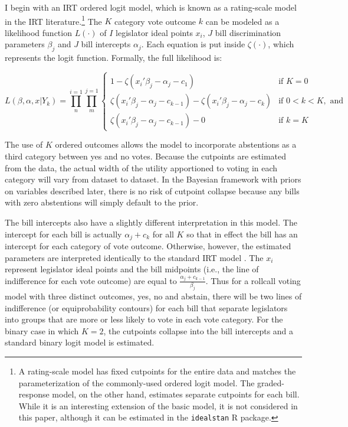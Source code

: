 	I begin with an IRT ordered logit model, which is known as a rating-scale model in the IRT literature.\footnote{A rating-scale model has fixed cutpoints for the entire data and matches the parameterization of the commonly-used ordered logit model. The graded-response model, on the other hand, estimates separate cutpoints for each bill. While it is an interesting extension of the basic model, it is not considered in this paper, although it can be estimated in the \texttt{idealstan} R package.} The $K$ category vote outcome $k$ can be modeled as a likelihood function $L(\cdot)$ of $I$ legislator ideal points $x_i$, $J$ bill discrimination parameters $\beta_j$ and $J$ bill intercepts $\alpha_j$. Each equation is put inside $\zeta(\cdot)$, which represents the logit function. Formally, the full likelihood is:
	
					\[
	L(\beta,\alpha,x|Y_{k}) = \prod_{n}^{i=1} \prod_{m}^{j=1}
	\begin{cases} 
	1 -  \zeta(x_{i}'\beta_j - \alpha_j - c_1) & \text{if } K = 0 \\
	\zeta(x_{i}'\beta_j - \alpha_j - c_{k-1}) - \zeta(x_{i}'\beta_j - \alpha_j - c_{k})       & \text{if } 0 < k < K, \text{ and} \\
	\zeta(x_{i}'\beta_j - \alpha_j - c_{k-1}) - 0 & \text{if } k=K
	\end{cases}
	\]
	
	The use of $K$ ordered outcomes allows the model to incorporate abstentions as a third category between yes and no votes. Because the cutpoints are estimated from the data, the actual width of the utility apportioned to voting in each category will vary from dataset to dataset. In the Bayesian framework with priors on variables described later, there is no risk of cutpoint collapse because any bills with zero abstentions will simply default to the prior.
	
	The bill intercepts also have a slightly different interpretation in this model. The intercept for each bill is actually $\alpha_j + c_k$ for all $K$ so that in effect the bill has an intercept for each category of vote outcome. Otherwise, however, the estimated parameters are interpreted identically to the standard IRT model \parencite{jackman2004}. The $x_i$ represent legislator ideal points and the bill midpoints (i.e., the line of indifference for each vote outcome) are equal to $\frac{\alpha_j + c_{k-1}}{\beta_j}$. Thus for a rollcall voting model with three distinct outcomes, yes, no and abstain, there will be two lines of indifference (or equiprobability contours) for each bill that separate legislators into groups that are more or less likely to vote in each vote category. For the binary case in which $K=2$, the cutpoints collapse into the bill intercepts and a standard binary logit model is estimated.
	
